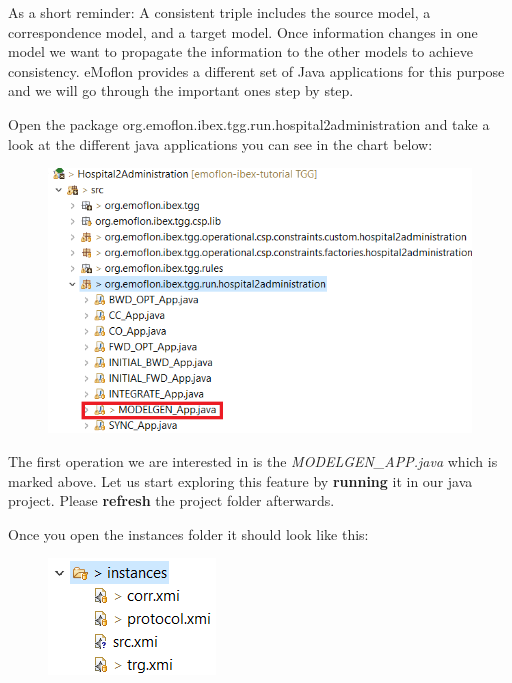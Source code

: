 {As a short reminder: A consistent triple includes the source model, a correspondence model, and a target model. Once information changes in one model we want to propagate the information to the other models to achieve consistency. eMoflon provides a different set of Java applications for this purpose and we will go through the important ones step by step. \newline

Open the package \textsf{org.emoflon.ibex.tgg.run.hospital2administration} and take a look at the different java applications you can see in the chart below:

\begin{figure}[h]
    \centering
    \includegraphics[scale=0.65 ]{pictures/modelGENApp.png}
    \caption{}
    \label{setDefaultNumber}
\end{figure}

The first operation we are interested in is the \textit{\textsf{MODELGEN\_APP.java}} which is marked above. Let us start exploring this feature by \textbf{running} it in our java project. Please \textbf{refresh} the project folder afterwards.\newline

Once you open the \textsf{instances} folder it should look like this:

\begin{figure}[h]
    \centering
    \includegraphics[scale=0.85 ]{pictures/instances.png}
    \caption{}
    \label{setDefaultNumber}
\end{figure}

}
